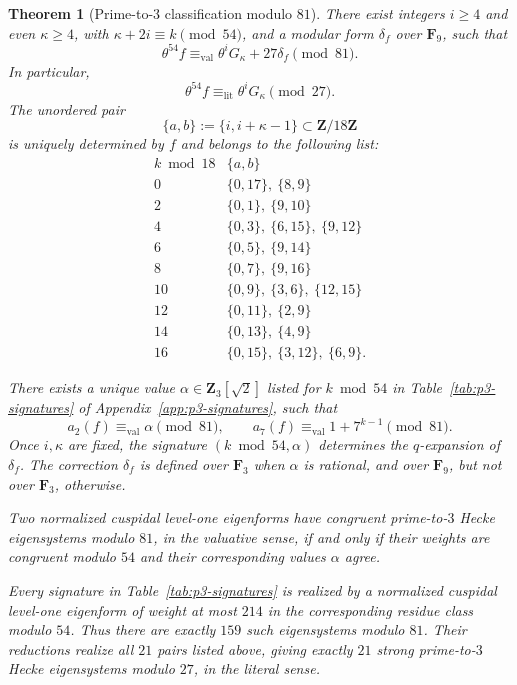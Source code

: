 \documentclass[11pt]{article}
\newcommand{\Z}{\mathbf Z}
\theoremstyle{plain}
\newtheorem{theorem}{Theorem}[section]
\theoremstyle{definition}
\theoremstyle{remark}
\numberwithin{equation}{section}
\begin{document}
\begin{theorem}[Prime-to-\(3\) classification modulo \(81\)] \label{thm:intro-p3} There exist integers \(i\geq4\) and even \(\kappa\geq4\), with \(\kappa+2i\equiv k\pmod{54}\), and a modular form \(\delta_f\) over \(\mathbf F_9\), such that \[ \theta^{54}f \equiv_{\mathrm{val}} \theta^iG_\kappa+27\delta_f\pmod{81}. \] In particular, \[ \theta^{54}f\equiv_{\mathrm{lit}}\theta^iG_\kappa\pmod{27}. \] The unordered pair \[ \{a,b\}:=\{i,i+\kappa-1\}\subset\mathbf Z/18\mathbf Z \] is uniquely determined by \(f\) and belongs to the following list:
\[
\begin{array}{c|l}
k\bmod18 & \{a,b\}\\ \hline
0  & \{0,17\},\ \{8,9\}\\
2  & \{0,1\},\ \{9,10\}\\
4  & \{0,3\},\ \{6,15\},\ \{9,12\}\\
6  & \{0,5\},\ \{9,14\}\\
8  & \{0,7\},\ \{9,16\}\\
10 & \{0,9\},\ \{3,6\},\ \{12,15\}\\
12 & \{0,11\},\ \{2,9\}\\
14 & \{0,13\},\ \{4,9\}\\
16 & \{0,15\},\ \{3,12\},\ \{6,9\}.
\end{array}
\]

There exists a unique value \(\alpha \in \Z_3[\sqrt 2]\) listed for \(k\bmod54\) in Table~\ref{tab:p3-signatures} of Appendix~\ref{app:p3-signatures}, such that \[ a_2(f)\equiv_{\mathrm{val}}\alpha\pmod{81}, \qquad a_7(f)\equiv_{\mathrm{val}}1+7^{k-1}\pmod{81}. \] Once \(i,\kappa\) are fixed, the signature \((k\bmod54,\alpha)\) determines the \(q\)-expansion of \(\delta_f\). The correction \(\delta_f\) is defined over \(\mathbf F_3\) when \(\alpha\) is rational, and over \(\mathbf F_9\), but not over \(\mathbf F_3\), otherwise.

Two normalized cuspidal level-one eigenforms have congruent prime-to-\(3\) Hecke eigensystems modulo \(81\), in the valuative sense, if and only if their weights are congruent modulo \(54\) and their corresponding values \(\alpha\) agree. 

Every signature in Table~\ref{tab:p3-signatures} is realized by a normalized cuspidal level-one eigenform of weight at most \(214\) in the corresponding residue class modulo \(54\). Thus there are exactly \(159\) such eigensystems modulo \(81\). Their reductions realize all \(21\) pairs listed above, giving exactly \(21\) strong prime-to-\(3\) Hecke eigensystems modulo \(27\), in the literal sense.
\end{theorem}
\end{document}
